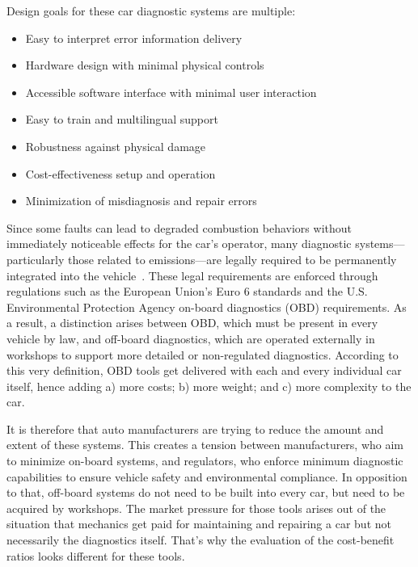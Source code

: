 \documentclass[conference,a4paper]{IEEEtran}
\begin{document}
Design goals for these car diagnostic systems are multiple:
\begin{itemize}
  \item Easy to interpret error information delivery
  \item Hardware design with minimal physical controls
  \item Accessible software interface with minimal user interaction
  \item Easy to train and multilingual support
  \item Robustness against physical damage
  \item Cost-effectiveness setup and operation
  \item Minimization of misdiagnosis and repair errors
\end{itemize}
Since some faults can lead to degraded combustion behaviors without immediately noticeable effects for the car’s operator, 
many diagnostic systems—particularly those related to emissions—are legally required to be permanently integrated into the vehicle~\cite{obdregulations, epaobd}. 
These legal requirements are enforced through regulations such as the European Union’s Euro 6 standards and the U.S. Environmental Protection Agency on-board diagnostics (OBD) requirements. 
As a result, a distinction arises between OBD, which must be present in every vehicle by law, and off-board diagnostics, 
which are operated externally in workshops to support more detailed or non-regulated diagnostics.
According to this very definition, OBD tools get delivered with each and every individual car itself, hence adding a) more costs; b) more weight; and c) more complexity to the car.

It is therefore that auto manufacturers are trying to reduce the amount and extent of these systems. 
This creates a tension between manufacturers, who aim to minimize on-board systems, and regulators, who enforce minimum diagnostic capabilities to ensure vehicle safety and environmental compliance.
In opposition to that, off-board systems do not need to be built into every car, but need to be acquired by workshops. 
The market pressure for those tools arises out of the situation that mechanics get paid for maintaining and repairing a car but not necessarily the diagnostics itself. 
That’s why the evaluation of the cost-benefit ratios looks different for these tools.
\end{document}
